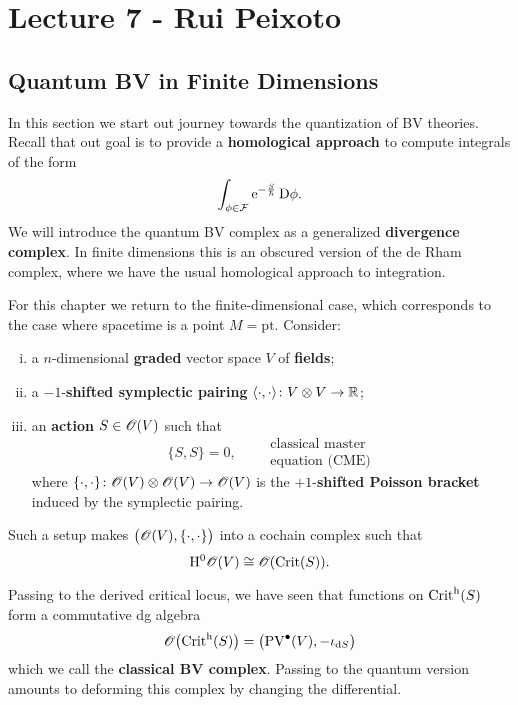 \chapter{Lecture 7 - Rui Peixoto}

\section{Quantum BV in Finite Dimensions}

In this section we start out journey towards the quantization of BV theories.
Recall that out goal is to provide a \textbf{homological approach} to compute integrals of the form
\begin{equation*}
  \int_{\phi \in \mathcal{F}} \mathrm{e}^{- \frac{S}{\hbar}} \, \mathrm{D} \phi.
\end{equation*}
We will introduce the quantum BV complex as a generalized \textbf{divergence complex}.
In finite dimensions this is an obscured version of the de Rham complex, where we have the usual homological approach to integration.

For this chapter we return to the finite-dimensional case, which corresponds to the case where spacetime is a point $M = \text{pt}$. Consider:
\begin{enumerate}[i)]
  \item a $n$-dimensional \textbf{graded} vector space $V$ of \textbf{fields};
  \item a $-1$-\textbf{shifted symplectic pairing} $\langle \cdot, \cdot \rangle \colon V \otimes V \to \mathbb{R}$;
  \item an \textbf{action} $S \in \mathscr{O}(V)$ such that
    \begin{equation*}
      \{ S, S \} =  0, \qquad \substack{\text{classical master} \\ \text{equation (CME)}}
    \end{equation*}
    where $\{ \cdot, \cdot \} \colon \mathscr{O}(V) \otimes \mathscr{O}(V) \rightarrow \mathscr{O}(V)$ is the $+1$-\textbf{shifted Poisson bracket} induced by the symplectic pairing.
\end{enumerate}
Such a setup makes $\bigl( \mathscr{O}(V), \{ \cdot, \cdot \} \bigr)$ into a cochain complex such that
\begin{equation*}
  \mathrm{H}^0 \mathscr{O}(V) \cong \mathscr{O}( \operatorname{Crit} (S)).
\end{equation*}

Passing to the derived critical locus, we have seen that functions on $\operatorname{Crit}^{\mathrm{h}}(S)$ form a commutative dg algebra
\begin{equation*}
  \mathscr{O} \bigl(\operatorname{Crit}^{\mathrm{h}}(S) \bigr) = \bigl( \operatorname{PV}^{\bullet} (V), -\iota_{\mathrm{d} S} \bigr)
\end{equation*}
which we call the \textbf{classical BV complex}. Passing to the quantum version amounts to deforming this complex by changing the differential.

